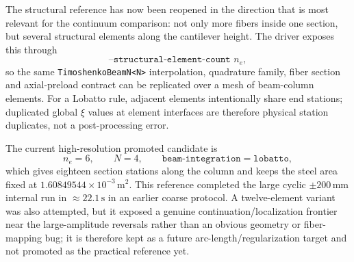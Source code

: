 The structural reference has now been reopened in the direction that is most
relevant for the continuum comparison: not only more fibers inside one
section, but several structural elements along the cantilever height.  The
driver exposes this through
\[
  \texttt{--structural-element-count } n_e,
\]
so the same \texttt{TimoshenkoBeamN<N>} interpolation, quadrature family,
fiber section and axial-preload contract can be replicated over a mesh of
beam-column elements.  For a Lobatto rule, adjacent elements intentionally
share end stations; duplicated global \(\xi\) values at element interfaces
are therefore physical station duplicates, not a post-processing error.

The current high-resolution promoted candidate is
\[
  n_e=6,\qquad N=4,\qquad
  \texttt{beam-integration}=\texttt{lobatto},
\]
which gives eighteen section stations along the column and keeps the steel
area fixed at \(1.60849544\times10^{-3}\,\mathrm{m^2}\).  This reference
completed the large cyclic \(\pm 200\,\mathrm{mm}\) internal run in
\(\approx 22.1\,\mathrm{s}\) in an earlier coarse protocol.  A twelve-element
variant was also attempted, but it exposed a genuine continuation/localization
frontier near the large-amplitude reversals rather than an obvious geometry or
fiber-mapping bug; it is therefore kept as a future arc-length/regularization
target and not promoted as the practical reference yet.


